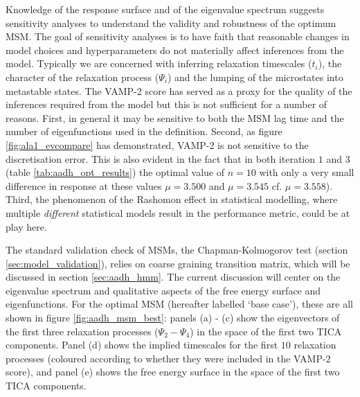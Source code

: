 Knowledge of the response surface and of the eigenvalue spectrum suggests sensitivity analyses to understand the validity and robustness of the optimum MSM.  The goal of sensitivity analyses is to have faith that reasonable changes in model choices and hyperparameters do not materially affect inferences from the model. Typically we are concerned with inferring relaxation timescales ($t_{i}$), the character of the relaxation process ($\Psi_{i}$) and the lumping of the microstates into metastable states. The VAMP-2 score has served as a proxy for the quality of the inferences required from the model but this is not sufficient  for a number of reasons.  First, in general it may be sensitive to both the MSM lag time and the number of eigenfunctions used in the definition. Second, as figure \ref{fig:ala1_evcompare} has demonstrated, VAMP-2 is not sensitive to the discretisation error. This is also evident in the fact that in both iteration $1$ and $3$ (table \ref{tab:aadh_opt_results}) the optimal value of $n=10$ with only a very small difference in response at these values $\mu = 3.500$ and   $\mu=3.545$ cf. $\mu=3.558$). Third, the phenomenon of the Rashomon effect \cite{breiman2001} in statistical modelling, where  multiple \emph{different} statistical models result in the performance metric, could be at play here.

The standard validation check of MSMs, the Chapman-Kolmogorov test (section \ref{sec:model_validation}), relies on coarse graining transition matrix, which will be discussed in section \ref{sec:aadh_hmm}. The current discussion will center on the eigenvalue spectrum and qualitative aspects of the free energy surface and eigenfunctions. For the optimal MSM (hereafter labelled `base case'), these are all shown in figure \ref{fig:aadh_msm_best}: panels (a) - (c) show the eigenvectors of the first three relaxation processes ($\Psi_{2} - \Psi_{4}$) in the space of the first two TICA components. Panel (d) shows the implied timescales for the first $10$ relaxation processes (coloured according to whether they were included in the VAMP-2 score), and panel (e) shows the free energy surface in the space of the first two TICA components.

